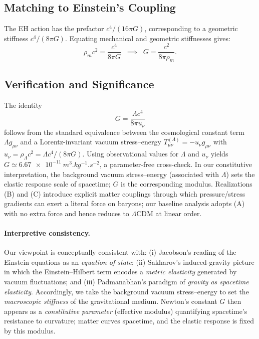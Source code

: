 \documentclass[11pt,a4paper]{article}
\begin{document}
\subsection{Matching to Einstein’s Coupling}
The EH action has the prefactor $c^4/(16\pi G)$, corresponding to a geometric stiffness $c^4/(8\pi G)$. 
Equating mechanical and geometric stiffnesses gives:
\begin{equation}
\label{eq:Gfromrho}
\rho_m c^2 = \frac{c^4}{8\pi G}
\;\;\implies\;\;
G = \frac{c^2}{8\pi \rho_m}.
\end{equation}

\subsection{Verification and Significance}
The identity
\begin{equation}
G=\frac{\Lambda c^4}{8\pi u_\nu}
\end{equation}
follows from the standard equivalence between the cosmological constant term
$\Lambda g_{\mu\nu}$ and a Lorentz-invariant vacuum stress--energy
$T^{(\Lambda)}_{\mu\nu}=-u_\nu g_{\mu\nu}$ with $u_\nu=\rho_\Lambda c^2=\Lambda c^4/(8\pi G)$.
Using observational values for $\Lambda$ and $u_\nu$ yields
$G\simeq \SI{6.67e-11}{m^3.kg^{-1}.s^{-2}}$, a parameter-free cross-check.
In our constitutive interpretation, the background vacuum stress--energy (associated with $\Lambda$)
sets the elastic response scale of spacetime; $G$ is the corresponding modulus.
Realizations (B) and (C) introduce explicit matter couplings through which pressure/stress gradients
can exert a literal force on baryons; our baseline analysis adopts (A) with no extra force and hence
reduces to $\Lambda$CDM at linear order.\cite{Jacobson1995,Gubitosi2013,BerezhianiKhoury2015}

\paragraph{Interpretive consistency.}
Our viewpoint is conceptually consistent with: (i) Jacobson’s reading of the Einstein equations
as an \emph{equation of state}; (ii) Sakharov’s induced-gravity picture in which the
Einstein--Hilbert term encodes a \emph{metric elasticity} generated by vacuum fluctuations; and
(iii) Padmanabhan’s paradigm of \emph{gravity as spacetime elasticity}.
Accordingly, we take the background vacuum stress--energy to set the \emph{macroscopic stiffness}
of the gravitational medium. Newton’s constant $G$ then appears as a \emph{constitutive parameter}
(effective modulus) quantifying spacetime’s resistance to curvature; matter curves spacetime, and
the elastic response is fixed by this modulus.\cite{Jacobson1995,Sakharov1967,Padmanabhan2004}
\end{document}
